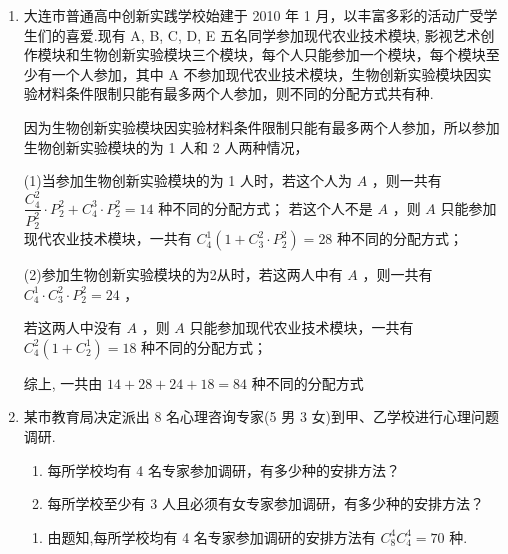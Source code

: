\begin{enumerate}
\begin{enumerate}
\begin{jieda}
            所以不同分配方法种数是 $\left( {{{C}}_{5}^{3} + \dfrac{{{C}}_{5}^{2}{{C}}_{3}^{2}}{P_{2}^{2}}}\right) P_{3}^{3} = \left( {{10} + {15}}\right)  \times  6 = {150}$ .
        \end{jieda}
        

        \item 大连市普通高中创新实践学校始建于 2010 年 1 月，以丰富多彩的活动广受学生们的喜爱.现有 A, B, C, D, E 五名同学参加现代农业技术模块, 影视艺术创作模块和生物创新实验模块三个模块，每个人只能参加一个模块，每个模块至少有一个人参加，其中 A 不参加现代农业技术模块，生物创新实验模块因实验材料条件限制只能有最多两个人参加，则不同的分配方式共有种.
        \begin{jieda}
            因为生物创新实验模块因实验材料条件限制只能有最多两个人参加，所以参加生物创新实验模块的为 1 人和 2 人两种情况，
            
            (1)当参加生物创新实验模块的为 1 人时，若这个人为 ${A}$ ，则一共有 $\dfrac{{{C}}_{4}^{2}}{P_{2}^{2}} \cdot  P_{2}^{2} + {{C}}_{4}^{3} \cdot  P_{2}^{2} = {14}$ 种不同的分配方式； 若这个人不是 $A$ ，则 $A$ 只能参加现代农业技术模块，一共有 ${{C}}_{4}^{1}\left( {1 + {{C}}_{3}^{2} \cdot  P_{2}^{2}}\right)  = {28}$ 种不同的分配方式；
            
            (2)参加生物创新实验模块的为2从时，若这两人中有 $A$ ，则一共有 ${{C}}_{4}^{1} \cdot  {{C}}_{3}^{2} \cdot  P_{2}^{2} = {24}$ ，
            
            若这两人中没有 $A$ ，则 $A$ 只能参加现代农业技术模块，一共有 ${{C}}_{4}^{2}\left( {1 + {{C}}_{2}^{1}}\right)  = {18}$ 种不同的分配方式；
            
            综上, 一共由 ${14} + {28} + {24} + {18} = {84}$ 种不同的分配方式
        \end{jieda}
        \item 某市教育局决定派出 8 名心理咨询专家(5 男 3 女)到甲、乙学校进行心理问题调研.
        \begin{enumerate}
            \item 每所学校均有 4 名专家参加调研，有多少种的安排方法？
            \item 每所学校至少有 3 人且必须有女专家参加调研，有多少种的安排方法？
        \end{enumerate}
        \begin{jieda}
            \begin{enumerate}
                \item 由题知,每所学校均有 4 名专家参加调研的安排方法有 ${{C}}_{8}^{4}{{C}}_{4}^{4} = {70}$ 种.
                

\end{enumerate}
\end{jieda}
\end{enumerate}
\end{enumerate}
